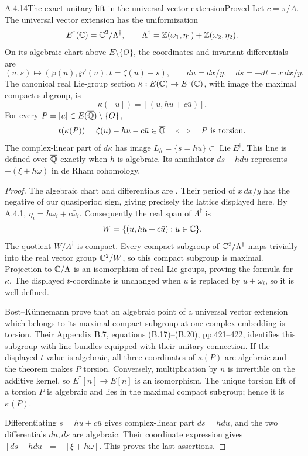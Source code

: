 \begin{result}{A.4.14}{The exact unitary lift in the universal vector extension}{Proved}
Let $c=\pi/A$. The universal vector extension has the uniformization
\[
 E^\dagger(\mathbb C)=\mathbb C^2/\Lambda^\dagger,\qquad
 \Lambda^\dagger=\mathbb Z(\omega_1,\eta_1)+\mathbb Z(\omega_2,\eta_2).
\]
On its algebraic chart above $E\setminus\{O\}$, the coordinates and invariant differentials are
\[
 (u,s)\longmapsto(\wp(u),\wp'(u),t=\zeta(u)-s),\qquad
 du=dx/y,\quad ds=-dt-x\,dx/y.
\]
The canonical real Lie-group section $\kappa:E(\mathbb C)\to E^\dagger(\mathbb C)$, with image the maximal compact subgroup, is
\[
 \kappa([u])=[(u,hu+c\bar u)].
\]
For every $P=[u]\in E(\overline{\mathbb Q})\setminus\{O\}$,
\[
 t(\kappa(P))=\zeta(u)-hu-c\bar u\in\overline{\mathbb Q}
 \quad\Longleftrightarrow\quad P\text{ is torsion}.
\]
The complex-linear part of $d\kappa$ has image $L_h=\{s=hu\}\subset\operatorname{Lie}E^\dagger$. This line is defined over $\overline{\mathbb Q}$ exactly when $h$ is algebraic. Its annihilator $ds-hdu$ represents $-(\xi+h\omega)$ in de Rham cohomology.
\end{result}
\begin{proof}
The algebraic chart and differentials are \cite[Sections 4.1--4.2, equation (4.1) and Proposition 4.2, pp.7--8]{EllFonsecaMatthes2020}. Their period of $x\,dx/y$ has the negative of our quasiperiod sign, giving precisely the lattice displayed here. By A.4.1,
$\eta_i=h\omega_i+c\bar\omega_i$. Consequently the real span of $\Lambda^\dagger$ is
\[
 W=\{(u,hu+c\bar u):u\in\mathbb C\}.
\]
The quotient $W/\Lambda^\dagger$ is compact. Every compact subgroup of $\mathbb C^2/\Lambda^\dagger$ maps trivially into the real vector group $\mathbb C^2/W$, so this compact subgroup is maximal. Projection to $\mathbb C/\Lambda$ is an isomorphism of real Lie groups, proving the formula for $\kappa$. The displayed $t$-coordinate is unchanged when $u$ is replaced by $u+\omega_i$, so it is well-defined.

Bost--K\"unnemann \cite[Theorem 3.1.2, p.386]{EllBostKunnemann2009} prove that an algebraic point of a universal vector extension which belongs to its maximal compact subgroup at one complex embedding is torsion. Their Appendix B.7, equations (B.17)--(B.20), pp.421--422, identifies this subgroup with line bundles equipped with their unitary connection. If the displayed $t$-value is algebraic, all three coordinates of $\kappa(P)$ are algebraic and the theorem makes $P$ torsion. Conversely, multiplication by $n$ is invertible on the additive kernel, so $E^\dagger[n]\to E[n]$ is an isomorphism. The unique torsion lift of a torsion $P$ is algebraic and lies in the maximal compact subgroup; hence it is $\kappa(P)$.

Differentiating $s=hu+c\bar u$ gives complex-linear part $ds=hdu$, and the two differentials $du,ds$ are algebraic. Their coordinate expression gives $[ds-hdu]=-[\xi+h\omega]$. This proves the last assertions.
\end{proof}

